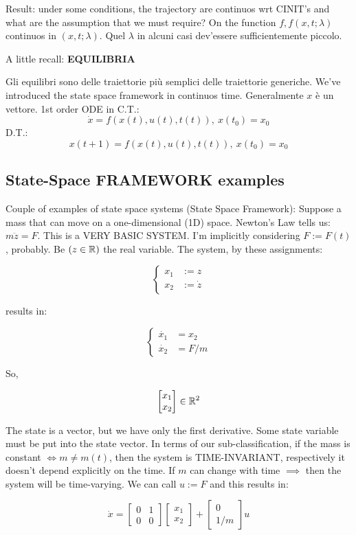 Result: under some conditions, the trajectory are continuos wrt CINIT's and what are the assumption that we must require? On the function $f, f(x,t;\lambda)$ continuos in $(x,t;\lambda)$. Quel $\lambda$ in alcuni casi dev'essere sufficientemente piccolo.


A little recall: \textbf{EQUILIBRIA}

Gli equilibri sono delle traiettorie più semplici delle traiettorie generiche. We've introduced the state space framework in continuos time. Generalmente $x$ è un vettore.
1st order ODE in C.T.:
\[
	\dot{x} = f(x(t),u(t),t(t)),\ x(t_0) = x_0
\]
D.T.:
\[
	x(t+1) = f(x(t),u(t),t(t)),\ x(t_0) = x_0
\]

\subsection{State-Space FRAMEWORK examples} 

Couple of examples of state space systems (State Space Framework):
Suppose a mass that can move on a one-dimensional (1D) space. Newton's Law tells us: $m\ddot{z} = F$. This is a VERY BASIC SYSTEM. I'm implicitly considering $F := F(t)$, probably. Be $(z \in \mathbb{R})$ the real variable. The system, by these assignments:

\[
 	\left\{
	\begin{aligned}
	x_1 &:= z \\
	x_2 &:= \dot{z}
	\end{aligned} 
	\right.
\]	

results in:

\[
 	\left\{
	\begin{aligned}
	\dot{x_1} &= x_2 \\
	\dot{x_2} &= F/m
	\end{aligned} 
	\right.
\]

So,

\[
	\begin{bmatrix}
	x_1 \\
	x_2
	\end{bmatrix}
	\in \mathbb{R}^2
\]	

The state is a vector, but we have only the first derivative. Some state variable must be put into the state vector. In terms of our sub-classification, if the mass is constant $\iff m \neq m(t)$, then the system is TIME-INVARIANT, respectively it doesn't depend explicitly on the time. If $m$ can change with time $\implies$ then the system will be time-varying. We can call $u := F$ and this results in:

\[
	\dot{x} = 
	\begin{bmatrix}
	0 & 1 \\
	0 & 0 
	\end{bmatrix}
	\begin{bmatrix}
	x_1 \\
	x_2
	\end{bmatrix} + 
	\begin{bmatrix}
	0 \\
	1/m
	\end{bmatrix} u
\]

